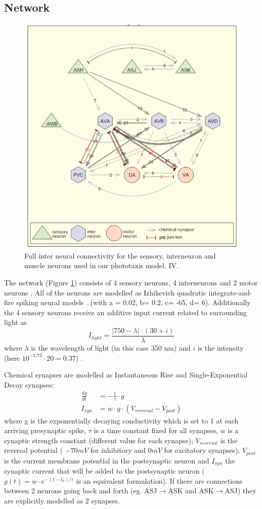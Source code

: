\subsection{Network} %
\label{sub:network}
	\begin{figure}
	\centering
	\includegraphics[width=0.5\linewidth]{network}
	\caption{Full inter neural connectivity for the sensory, interneuron and muscle neurons used in our phototaxis model.
	IV.}
	\label{fig:network}
	\end{figure}

The network (Figure \ref{fig:network}) consists of 4 sensory neurons, 4 interneurons and 2 motor neurons \cite{Appiah}. All of the neurons are modelled as Izhikevich quadratic integrate-and-fire spiking neural models \cite{izi}. (with a = 0.02, b= 0.2, c= -65, d= 6). Additionally the 4 sensory neurons receive an additive input current related to surrounding light as 
\[I_{light} = \frac{|750- \lambda| \cdot (30+i)}{\lambda}\]
where $\lambda$ is the wavelength of light (in this case 350 nm) and $i$ is the intensity (here $10^{-1.73} \cdot 20 = 0.37$) \cite{Appiah}.

Chemical synapses are modelled as Instantaneous Rise and Single-Exponential Decay synapses:
\begin{align*}
	\frac{dg}{dt} &= -\frac{1}{\tau}\cdot g  \\
	I_{syn} &= w \cdot g \cdot (V_{reversal} - V_{post})
\end{align*}
where g is the exponentially decaying conductivity which is set to 1 at each arriving presynaptic spike, $\tau$ is a time constant fixed for all synapses, $w$ is a synaptic strength constant (different value for each synapse), $V_{reversal}$ is the reversal potential ( $-70 mV$ for inhibitory and $0 mV$ for excitatory synapses), $V_{post}$ is the current membrane potential in the postsynaptic neuron and $I_{syn}$ the synaptic current that will be added to the postsynaptic neuron ($g(t) = w \cdot e ^ {-(t-t_0)/\tau} $ is an equivalent formulation). If there are connections between 2 neurons going back and forth (eg. ASJ$\rightarrow$ASK and ASK$\rightarrow$ASJ) they are explicitly modelled as 2 synapses.  

